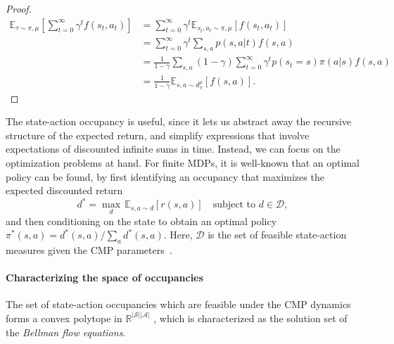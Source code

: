 \documentclass{article}
\theoremstyle{plain}
\theoremstyle{definition}
\theoremstyle{remark}
\begin{document}
\begin{proof}
    \begin{align}
        \mathbb{E}_{\tau \sim \pi,\mu} \left[ \sum_{t=0}^\infty \gamma^t f(s_t, a_t) \right] &= \sum_{t=0}^\infty \gamma^t \mathbb{E}_{s_t, a_t \sim \pi,\mu} [f(s_t, a_t)]\\
        &= \sum_{t=0}^\infty \gamma^t \sum_{s,a}p(s,a|t) f(s, a)\\
        &= \frac{1}{1-\gamma}\sum_{s,a}(1-\gamma)\sum_{t=0}^\infty \gamma^t p(s_t=s)\pi(a|s) f(s, a)\\
        &= \frac{1}{1-\gamma}\mathbb{E}_{s, a \sim d^\mu_\pi} [f(s, a)].
    \end{align}
\end{proof}

The state-action occupancy is useful, since it lets us abstract away the recursive structure of the expected return, and simplify expressions that involve expectations of discounted infinite sums in time. Instead, we can focus on the optimization problems at hand. For finite MDPs, it is well-known that an optimal policy can be found, by first identifying an occupancy that maximizes the expected discounted return
\begin{equation}\label{eq:lin-program}
    d^* = \max_d\, \mathbb{E}_{s,a\sim d}[r(s,a)]
    \quad \text{subject to } d \in \mathcal{D},
\end{equation}
and then conditioning on the state to obtain an optimal policy $\pi^*(s,a) = d^*(s,a)/\sum_{a}d^*(s,a)$.
Here, $\mathcal{D}$ is the set of feasible state-action measures given the CMP parameters~\citep{feinberg2012handbook}.

\paragraph{Characterizing the space of occupancies}
The set of state-action occupancies which are feasible under the CMP dynamics forms a convex polytope in $\mathbb{R}^{|\mathcal{S}||\mathcal{A}|}$ \citep{kallenberg1994survey}, which is characterized as the solution set of the \emph{Bellman flow equations}.
\end{document}
